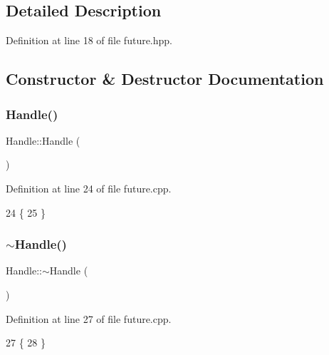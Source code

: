 \subsection{Detailed Description}


Definition at line 18 of file future.\+hpp.



\subsection{Constructor \& Destructor Documentation}
\hypertarget{classshark_1_1_handle_a4e3b97f227b72125e595164e0a6629a7}{}\label{classshark_1_1_handle_a4e3b97f227b72125e595164e0a6629a7} 
\subsubsection{\texorpdfstring{Handle()}{Handle()}}
{\footnotesize\ttfamily Handle\+::\+Handle (\begin{DoxyParamCaption}{ }\end{DoxyParamCaption})}



Definition at line 24 of file future.\+cpp.


\begin{DoxyCode}
24                \{
25 \}
\end{DoxyCode}
\hypertarget{classshark_1_1_handle_ad63422289041b1a0fbebae079786ae22}{}\label{classshark_1_1_handle_ad63422289041b1a0fbebae079786ae22} 
\subsubsection{\texorpdfstring{$\sim$\+Handle()}{~Handle()}}
{\footnotesize\ttfamily Handle\+::$\sim$\+Handle (\begin{DoxyParamCaption}{ }\end{DoxyParamCaption})\hspace{0.3cm}{\ttfamily [virtual]}}



Definition at line 27 of file future.\+cpp.


\begin{DoxyCode}
27                 \{
28 \}
\end{DoxyCode}


